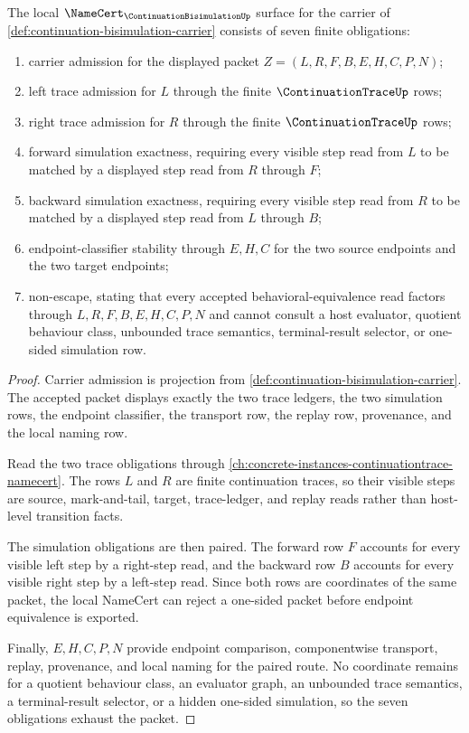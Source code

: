 \begin{theorem}
\label{thm:continuation-bisimulation-namecert-obligations}
The local $\NameCert_{\ContinuationBisimulationUp}$ surface for the carrier of \autoref{def:continuation-bisimulation-carrier} consists of seven finite obligations:
\begin{enumerate}
\item carrier admission for the displayed packet $Z=(L,R,F,B,E,H,C,P,N)$;
\item left trace admission for $L$ through the finite $\ContinuationTraceUp$ rows;
\item right trace admission for $R$ through the finite $\ContinuationTraceUp$ rows;
\item forward simulation exactness, requiring every visible step read from $L$ to be matched by a displayed step read from $R$ through $F$;
\item backward simulation exactness, requiring every visible step read from $R$ to be matched by a displayed step read from $L$ through $B$;
\item endpoint-classifier stability through $E,H,C$ for the two source endpoints and the two target endpoints;
\item non-escape, stating that every accepted behavioral-equivalence read factors through $L,R,F,B,E,H,C,P,N$ and cannot consult a host evaluator, quotient behaviour class, unbounded trace semantics, terminal-result selector, or one-sided simulation row.
\end{enumerate}
\end{theorem}
\begin{proof}
Carrier admission is projection from \autoref{def:continuation-bisimulation-carrier}. The accepted packet displays exactly the two trace ledgers, the two simulation rows, the endpoint classifier, the transport row, the replay row, provenance, and the local naming row.

Read the two trace obligations through \autoref{ch:concrete-instances-continuationtrace-namecert}. The rows $L$ and $R$ are finite continuation traces, so their visible steps are source, mark-and-tail, target, trace-ledger, and replay reads rather than host-level transition facts.

The simulation obligations are then paired. The forward row $F$ accounts for every visible left step by a right-step read, and the backward row $B$ accounts for every visible right step by a left-step read. Since both rows are coordinates of the same packet, the local NameCert can reject a one-sided packet before endpoint equivalence is exported.

Finally, $E,H,C,P,N$ provide endpoint comparison, componentwise transport, replay, provenance, and local naming for the paired route. No coordinate remains for a quotient behaviour class, an evaluator graph, an unbounded trace semantics, a terminal-result selector, or a hidden one-sided simulation, so the seven obligations exhaust the packet.
\end{proof}

